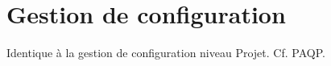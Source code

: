 \section{Gestion de configuration}

Identique à la gestion de configuration niveau Projet.
Cf. PAQP.
